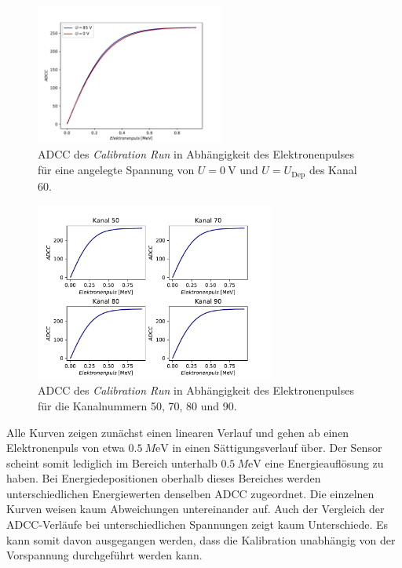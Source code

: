 \begin{figure}
  \centering
  \includegraphics[width=0.55\textwidth]{plots/0V_80V_Vergleich.pdf}
  \caption{ADCC des \textit{Calibration Run} in Abhängigkeit des Elektronenpulses für eine angelegte Spannung von $U=\SI{0}{\volt}$ und $U=U_{\mathrm{Dep}}$ des Kanal 60.}
  \label{fig:0V80V}
\end{figure}
\FloatBarrier
\begin{figure}
  \centering
  \includegraphics[width=0.7\textwidth]{plots/Kalib_Kanal_Plot.pdf}
  \caption{ADCC des \textit{Calibration Run} in Abhängigkeit des Elektronenpulses für die Kanalnummern 50, 70, 80 und 90.}
  \label{fig:KanalPlot}
\end{figure}
\FloatBarrier
Alle Kurven zeigen zunächst einen linearen Verlauf und gehen ab einen Elektronenpuls von etwa $\SI{0.5}{M\electronvolt}$ in einen Sättigungsverlauf über. Der Sensor scheint somit lediglich im Bereich unterhalb $\SI{0.5}{M\electronvolt}$ eine Energieauflösung zu haben. Bei Energiedepositionen oberhalb dieses Bereiches werden unterschiedlichen Energiewerten denselben ADCC zugeordnet.
Die einzelnen Kurven weisen kaum Abweichungen untereinander auf. Auch der Vergleich der ADCC-Verläufe bei unterschiedlichen Spannungen zeigt kaum Unterschiede. Es kann somit davon ausgegangen werden, dass die Kalibration unabhängig von der Vorspannung durchgeführt werden kann.

